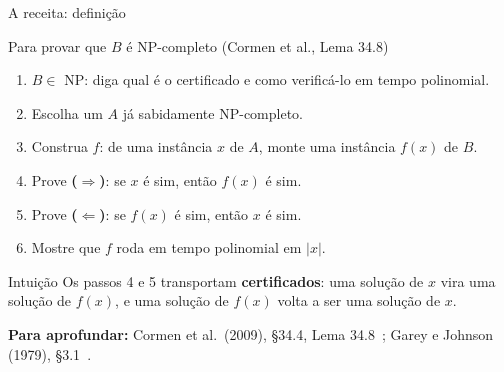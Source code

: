 \documentclass[aspectratio=169,xcolor=table]{beamer}
\newcommand{\fonte}[1]{%
  \vfill
  {\tiny\color{gray!55!black}\textbf{Para aprofundar:} #1\par}%
}
\begin{document}
\begin{frame}{A receita: definição}
  \begin{block}{Para provar que $B$ é NP-completo (Cormen et al., Lema 34.8)}
    \scriptsize
    \begin{enumerate}
      \item $B \in$ NP: diga qual é o certificado e como verificá-lo em tempo polinomial.
      \item Escolha um $A$ já sabidamente NP-completo.
      \item Construa $f$: de uma instância $x$ de $A$, monte uma instância $f(x)$ de $B$.
      \item Prove \textbf{($\Rightarrow$)}: se $x$ é sim, então $f(x)$ é sim.
      \item Prove \textbf{($\Leftarrow$)}: se $f(x)$ é sim, então $x$ é sim.
      \item Mostre que $f$ roda em tempo polinomial em $|x|$.
    \end{enumerate}
  \end{block}
  \begin{exampleblock}{Intuição}
    \scriptsize
    Os passos 4 e 5 transportam \textbf{certificados}: uma solução de $x$ vira uma solução
    de $f(x)$, e uma solução de $f(x)$ volta a ser uma solução de $x$.
  \end{exampleblock}
  \fonte{Cormen et al.\ (2009), \S 34.4, Lema 34.8~\cite{cormen2009introduction};
    Garey e Johnson (1979), \S 3.1~\cite{garey1979computers}.}
\end{frame}
\end{document}
